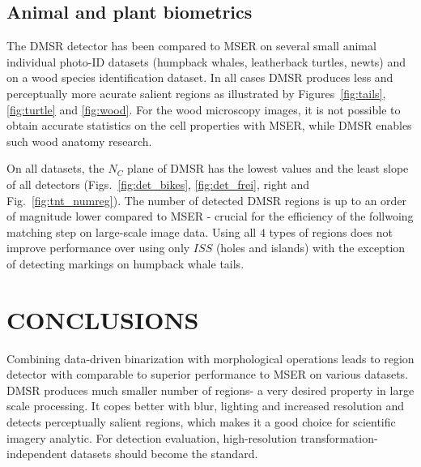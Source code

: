 \documentclass{article}
\begin{document}
\subsection{Animal and plant biometrics}
\label{ssec:bio}
The DMSR detector has been compared to MSER on several small animal individual photo-ID datasets (humpback whales, leatherback turtles, newts) and on a wood species identification dataset. In all cases DMSR produces less and perceptually more acurate salient regions as illustrated by Figures~\ref{fig:tails}, \ref{fig:turtle} and \ref{fig:wood}. For the wood microscopy images, it is not possible to obtain accurate statistics on the cell properties with MSER, while DMSR enables such wood anatomy research.

On all datasets, the $N_C$ plane of DMSR has the lowest values and the least slope of all detectors (Figs.~\ref{fig:det_bikes}, \ref{fig:det_frei}, right and Fig.~\ref{fig:tnt_numreg}). 
The number of detected DMSR regions is up to an order of magnitude lower compared to MSER - crucial for the efficiency of the follwoing matching step on large-scale image data.
Using all $4$ types of regions does not improve performance over using only $ISS$ (holes and islands) with the exception of detecting markings on humpback whale tails. 

\section{CONCLUSIONS}
Combining data-driven binarization with morphological operations leads to region detector with comparable to superior performance to MSER on various datasets. DMSR produces much smaller number of regions- a very desired property in large scale processing. It copes better with blur, lighting and increased resolution and detects perceptually salient regions, which makes it a good choice for scientific imagery analytic. 
For detection evaluation, high-resolution transformation-independent datasets should become the standard.
\label{sec:concl}










\end{document}
